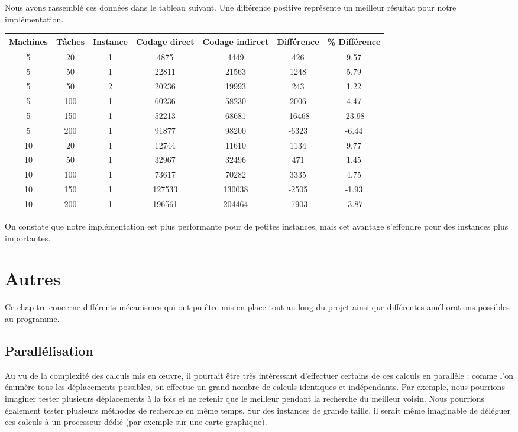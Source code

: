 \documentclass[hideweeklyreports]{polytech/polytech}
\begin{document}
			Nous avons rassemblé ces données dans le tableau suivant. Une différence positive représente un meilleur résultat pour notre implémentation.

			\begin{centering}
				\begin{tabularx}{\textwidth}{|c|c|c||c|c||c|c|}
					\hline
					Machines & Tâches & Instance & Codage direct & Codage indirect & Différence & \% Différence\\\hline\hline\endhead
					5 & 20 & 1 & 4875 & 4449 & 426 & 9.57\\\hline
					5 & 50 & 1 & 22811 & 21563 & 1248 & 5.79\\\hline
					5 & 50 & 2 & 20236 & 19993 & 243 & 1.22\\\hline
					5 & 100 & 1 & 60236 & 58230 & 2006 & 4.47\\\hline
					5 & 150 & 1 & 52213 & 68681 & -16468 & -23.98\\\hline
					5 & 200 & 1 & 91877 & 98200 & -6323 & -6.44\\\hline
					10 & 20 & 1 & 12744 & 11610 & 1134 & 9.77\\\hline
					10 & 50 & 1 & 32967 & 32496 & 471 & 1.45\\\hline
					10 & 100 & 1 & 73617 & 70282 & 3335 & 4.75\\\hline
					10 & 150 & 1 & 127533 & 130038 & -2505 & -1.93\\\hline
					10 & 200 & 1 & 196561 & 204464 & -7903 & -3.87\\\hline
				\end{tabularx}
			\end{centering}
			
			On constate que notre implémentation est plus performante pour de petites instances, mais cet avantage s'effondre pour des instances plus importantes.
	
	\chapter{Autres}
		Ce chapitre concerne différents mécanismes qui ont pu être mis en place tout au long du projet ainsi que différentes améliorations possibles au programme.
		
		\section{Parallélisation}
			Au vu de la complexité des calculs mis en œuvre, il pourrait être très intéressant d'effectuer certains de ces calculs en parallèle : comme l'on énumère tous les déplacements possibles, on effectue un grand nombre de calculs identiques et indépendants. Par exemple, nous pourrions imaginer tester plusieurs déplacements à la fois et ne retenir que le meilleur pendant la recherche du meilleur voisin. Nous pourrions également tester plusieurs méthodes de recherche en même temps. Sur des instances de grande taille, il serait même imaginable de déléguer ces calculs à un processeur dédié (par exemple sur une carte graphique).
		
\end{document}
